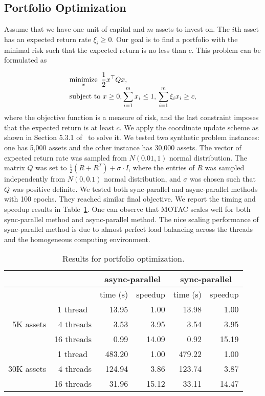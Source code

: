 \subsection{Portfolio Optimization}
Assume that we have one unit of capital and $m$ assets to invest on. The $i$th asset has an expected return rate $\xi_i\ge 0$. Our goal is to find a portfolio with the minimal risk such that the expected return is no less than $c$. This problem can be formulated as

\begin{equation*}
\begin{array}{l}
\displaystyle
\operatorname*{minimize}_x ~ \frac{1}{2} x^\top Q x, \\
\displaystyle
\text{subject to}~ x\ge0, \sum_{i=1}^m x_i\le 1,\, \sum_{i=1}^m\xi_i x_i\ge c,
\end{array}
\end{equation*}
where the objective function is a measure of risk, and the last constraint imposes that the expected return is at least $c$. We apply the coordinate update scheme as shown in Section 5.3.1 of~\citep{PengWuXuYanYin2016_coordinate} to solve it.
We tested two synthetic  problem instances: one has 5,000 assets and the other instance has 30,000 assets.
The vector of expected return rate was sampled from $N(0.01, 1)$ normal distribution.
The matrix $Q$ was set to $\frac{1}{2} (R + R^T) + \sigma \cdot I$, where the entries of $R$ was sampled independently from $N(0, 0.1)$ normal distribution, and $\sigma$ was chosen such that $Q$ was positive definite.
We tested both sync-parallel and async-parallel methods with 100 epochs. They reached similar final objective. We report the timing and speedup results in Table~\ref{tab:port_opt}. One can observe that  MOTAC scales well for both sync-parallel method and async-parallel method. The nice scaling performance of sync-parallel method is due to almost perfect load balancing across the threads and the homogeneous computing environment.
\begin{table}[!h]
\centering
\begin{tabular}{rrrrrr}
\toprule
\multirow{2}{*}{} & &  \multicolumn{2}{c}{async-parallel} & \multicolumn{2}{c}{sync-parallel} \\
\midrule
 & & time (s) & speedup & time (s) & speedup \\
 \midrule
 \multirow{3}{*}{5K assets} & 1 thread~ & 13.95& 1.00 & 13.98& 1.00 \\
  & 4 threads & 3.53& 3.95 &3.54 & 3.95\\
 & 16 threads & 0.99 &14.09 &0.92 & 15.19\\
\midrule
 \multirow{3}{*}{30K assets} & 1 thread~ & 483.20& 1.00& 479.22& 1.00 \\
  & 4 threads & 124.94& 3.86 &123.74 & 3.87\\
 & 16 threads & 31.96 &15.12 &33.11 & 14.47\\
\bottomrule
\end{tabular}
 \caption{\label{tab:port_opt}Results for portfolio optimization. }
\end{table}

